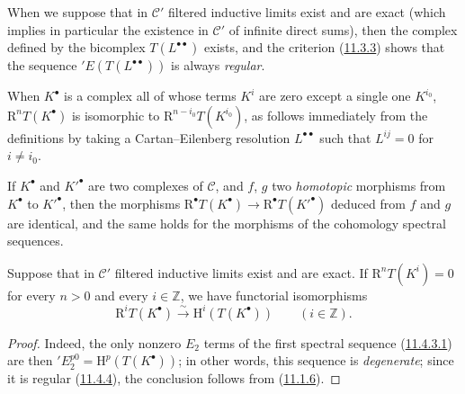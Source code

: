 \begin{env}[11.4.3]
When we suppose that in $\mathcal C'$ filtered inductive limits
exist and are exact (which implies in particular the existence in
$\mathcal C'$ of infinite direct sums), then the complex defined by the
bicomplex $T(L^{\bullet\bullet})$ exists, and the criterion
(\hyperref[0.11.3.3]{11.3.3}) shows that the sequence
$'E(T(L^{\bullet\bullet}))$ is always \emph{regular}.

When $K^\bullet$ is a complex all of whose terms $K^i$ are zero except
a single one $K^{i_0}$, $\mathrm R^nT(K^\bullet)$ is isomorphic to
$\mathrm R^{n-i_0}T(K^{i_0})$, as follows immediately from the definitions by
taking a Cartan--Eilenberg resolution $L^{\bullet\bullet}$ such that
$L^{ij}=0$ for $i\neq i_0$.

If $K^\bullet$ and $K'^\bullet$ are two complexes of $\mathcal C$, and $f$, $g$
two \emph{homotopic} morphisms from $K^\bullet$ to $K'^\bullet$, then the
morphisms $\mathrm R^\bullet T(K^\bullet)\to
\mathrm R^\bullet T(K'^\bullet)$ deduced from $f$ and $g$ are identical, and the
same holds for the morphisms of the cohomology spectral sequences.
\end{env}

\begin{proposition}[11.4.5]
\label{0.11.4.5}
Suppose that in $\mathcal C'$ filtered inductive limits exist and
are exact. If $\mathrm R^nT(K^i)=0$ for every $n>0$ and every
$i\in\mathbb Z$, we have functorial isomorphisms
\[
  \label{0.11.4.5.1}
  \mathrm R^iT(K^\bullet)\xrightarrow{\sim}
  \mathrm H^i(T(K^\bullet))\qquad(i\in\mathbb Z).
  \tag{11.4.5.1}
\]
\end{proposition}

\begin{proof}
Indeed, the only nonzero $E_2$ terms of the first spectral sequence
(\hyperref[0.11.4.3.1]{11.4.3.1}) are then
$'E_2^{p0}=\mathrm H^p(T(K^\bullet))$; in other words, this sequence is
\emph{degenerate}; since it is regular
(\hyperref[0.11.4.4]{11.4.4}), the conclusion follows from
(\hyperref[0.11.1.6]{11.1.6}).
\end{proof}

